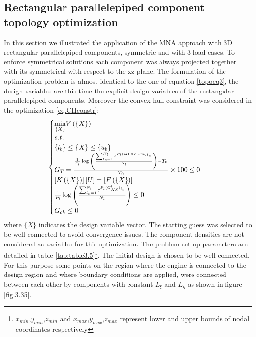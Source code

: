  \subsection{Rectangular parallelepiped component topology optimization}
  \label{ss3.10.3}
  In this section we illustrated the application of the MNA approach with 3D rectangular parallelepiped components, symmetric and with 3 load cases. 
  To enforce symmetrical solutions each component was always projected together with its symmetrical with respect to the xz plane. The formulation of the optimization problem is almost identical to the one of equation \ref{topoeq3}, the design variables are this time the explicit design variables of the rectangular parallelepiped components. Moreover the convex hull constraint was considered in the optimization \ref{eq.CHconstr}:\\
   \begin{equation}
   \label{topoeq4}
   \begin{cases}
   \underset{\lbrace X\rbrace}{\min} V\left(\lbrace X\rbrace\right)& \\
   s.t. & \\ \left\lbrace{l_b}\right \rbrace\leq \left\lbrace{X}\right \rbrace \leq \left\lbrace{u_b}\right \rbrace  \\
   G_T=\frac{\frac{1}{P_l}\log{\left(\frac{\sum_{l_c=1}^{N_l}e^{P_l(\Delta TSFC \% )_{l_c}}}{N_l}\right)}-T_0}{T_0}\times 100 \leq 0 & \\
   \left[K\left(\lbrace X\rbrace\right)\right]\left[{U}\right] = \left[{ F \left(\lbrace X\rbrace\right)}\right]& \\
   \frac{1}{P_l}\log{\left(\frac{\sum_{l_c=1}^{N_l}e^{P_l(G^{l}_{KS})_{l_c}}}{N_l}\right)}\leq 0\\
   G_{ch}\leq 0
   \end{cases}
   \end{equation}
   where $\lbrace X\rbrace$ indicates the design variable vector.
    The starting guess was selected to be well connected to avoid convergence issues. The component densities are not considered as variables for this optimization. The problem set up parameters are detailed in table \ref{tab:table3.5}\footnote{$x_{min}$,$y_{min}$,$z_{min}$ and $x_{max}$,$y_{max}$,$z_{max}$ represent lower and upper bounds of nodal coordinates respectively}. The initial design is chosen to be well connected. For this purpose some points on the region where the engine is connected to the design region and where boundary conditions are applied, were connected between each other by components with constant $L_\xi$ and $L_\eta$ as shown in figure \ref{fig.3.35}.
